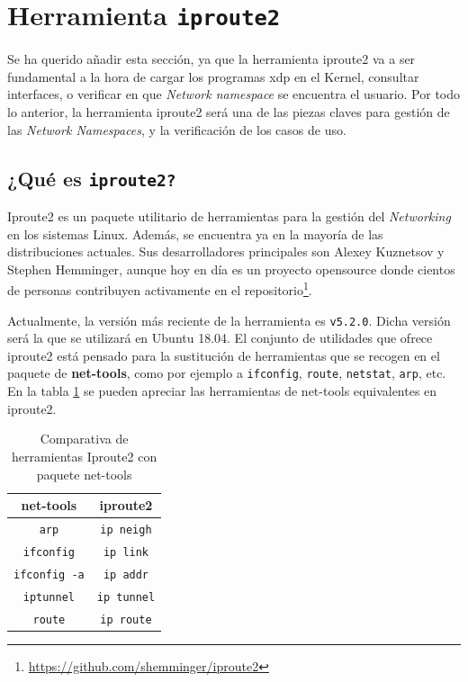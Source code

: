 \section{Herramienta \texttt{iproute2}}
\label{iproute2}
Se ha querido añadir esta sección, ya que la herramienta iproute2 va a ser fundamental a la hora de cargar los programas \gls{xdp} en el Kernel, consultar interfaces, o verificar en que \textit{Network namespace} se encuentra el usuario. Por todo lo anterior, la herramienta iproute2 será una de las piezas claves para gestión de las \textit{Network Namespaces}, y la verificación de los casos de uso.



\subsection{¿Qué es \texttt{iproute2?}}

Iproute2 es un paquete utilitario de herramientas para la gestión del \textit{Networking} en los sistemas Linux. Además, se encuentra ya en la mayoría de las distribuciones actuales. Sus desarrolladores principales son Alexey Kuznetsov y Stephen Hemminger, aunque hoy en día es un proyecto opensource donde cientos de personas contribuyen activamente en el repositorio\footnote{\url{https://github.com/shemminger/iproute2}}.  \\
\par
Actualmente, la versión más reciente de la herramienta es \texttt{v5.2.0}. Dicha versión será la que se utilizará en Ubuntu 18.04. El conjunto de utilidades que ofrece iproute2 está pensado para la sustitución de herramientas que se recogen en el paquete de \textbf{net-tools}, como por ejemplo a \texttt{ifconfig}, \texttt{route}, \texttt{netstat}, \texttt{arp}, etc. En la tabla \ref{tab:ipNettools} se pueden apreciar las herramientas de net-tools equivalentes en iproute2.

\begin{table}[ht]
    \centering
    \begin{tabular}{|c|c|}
        \hline
        \rowcolor[HTML]{C0C0C0}
        {\color[HTML]{000000} \textbf{net-tools}} & {\color[HTML]{000000} \textbf{iproute2}} \\ \hline
        \texttt{arp}                              & \texttt{ip neigh}                        \\ \hline
        \texttt{ifconfig}                         & \texttt{ip link}                         \\ \hline
        \texttt{ifconfig -a}                      & \texttt{ip addr}                         \\ \hline
        \texttt{iptunnel}                         & \texttt{ip tunnel}                       \\ \hline
        \texttt{route}                            & \texttt{ip route}                        \\ \hline
    \end{tabular}
    \caption{Comparativa de herramientas Iproute2 con paquete net-tools}
    \label{tab:ipNettools}
\end{table}

